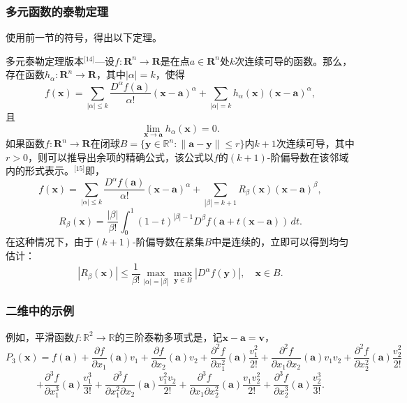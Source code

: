 \subsubsection{多元函数的泰勒定理}  
使用前一节的符号，得出以下定理。

多元泰勒定理版本\(^\text{[14]}\)—设\( f : \mathbf{R}^n \to \mathbf{R} \)是在点\( a \in \mathbf{R}^n \)处\( k \)次连续可导的函数。那么，存在函数\( h_\alpha : \mathbf{R}^n \to \mathbf{R} \)，其中\( |\alpha| = k \)，使得
\[
f(\mathbf{x}) = \sum_{|\alpha| \leq k} \frac{D^\alpha f(\mathbf{a})}{\alpha!} (\mathbf{x} - \mathbf{a})^\alpha + \sum_{|\alpha| = k} h_\alpha(\mathbf{x}) (\mathbf{x} - \mathbf{a})^\alpha,~
\]
且
\[
\lim_{\mathbf{x} \to \mathbf{a}} h_\alpha(\mathbf{x}) = 0.~
\]
如果函数\( f : \mathbf{R}^n \to \mathbf{R} \)在闭球\( B = \{ \mathbf{y} \in \mathbb{R}^n : \|\mathbf{a} - \mathbf{y}\| \leq r \} \)内\( k + 1 \)次连续可导，其中 \( r > 0 \)，则可以推导出余项的精确公式，该公式以\( f \)的\( (k+1) \)-阶偏导数在该邻域内的形式表示。\(^\text{[15]}\)即，
\[
f(\mathbf{x}) = \sum_{|\alpha| \leq k} \frac{D^\alpha f(\mathbf{a})}{\alpha!} (\mathbf{x} - \mathbf{a})^\alpha + \sum_{|\beta| = k+1} R_\beta(\mathbf{x}) (\mathbf{x} - \mathbf{a})^\beta,~
\]
\[
R_\beta(\mathbf{x}) = \frac{|\beta|}{\beta!} \int_0^1 (1 - t)^{|\beta| - 1} D^\beta f\left( \mathbf{a} + t (\mathbf{x} - \mathbf{a}) \right) \, dt.~
\]
在这种情况下，由于\( (k+1) \)-阶偏导数在紧集\( B \)中是连续的，立即可以得到均匀估计：
\[
|R_\beta(\mathbf{x})| \leq \frac{1}{\beta!} \max_{|\alpha| = |\beta|} \max_{\mathbf{y} \in B} |D^\alpha f(\mathbf{y})|, \quad \mathbf{x} \in B.~
\]
\subsubsection{二维中的示例}  
例如，平滑函数\( f : \mathbb{R}^2 \to \mathbb{R} \)的三阶泰勒多项式是，记\(\mathbf{x} - \mathbf{a} = \mathbf{v} \)，
\[
P_3(\mathbf{x}) = f(\mathbf{a}) + \frac{\partial f}{\partial x_1}(\mathbf{a}) v_1 + \frac{\partial f}{\partial x_2}(\mathbf{a}) v_2 + \frac{\partial^2 f}{\partial x_1^2}(\mathbf{a}) \frac{v_1^2}{2!} + \frac{\partial^2 f}{\partial x_1 \partial x_2}(\mathbf{a}) v_1 v_2 + \frac{\partial^2 f}{\partial x_2^2}(\mathbf{a}) \frac{v_2^2}{2!} ~
\]
\[
+ \frac{\partial^3 f}{\partial x_1^3}(\mathbf{a}) \frac{v_1^3}{3!} + \frac{\partial^3 f}{\partial x_1^2 \partial x_2}(\mathbf{a}) \frac{v_1^2 v_2}{2!} + \frac{\partial^3 f}{\partial x_1 \partial x_2^2}(\mathbf{a}) \frac{v_1 v_2^2}{2!} + \frac{\partial^3 f}{\partial x_2^3}(\mathbf{a}) \frac{v_2^3}{3!}.~
\]
